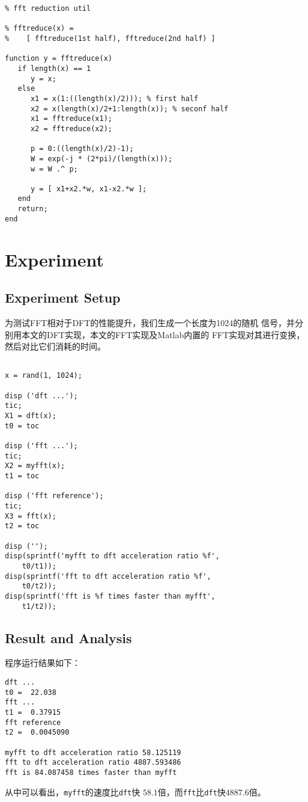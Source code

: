 \documentclass[12pt, a4paper]{article}
\begin{document}
\begin{CJK}{UTF8}{gkai}
\begin{lstlisting}[caption={fftreduce.m}]
% myfft internal helper
% fft reduction util

% fftreduce(x) = 
%    [ fftreduce(1st half), fftreduce(2nd half) ]

function y = fftreduce(x)
   if length(x) == 1
      y = x;
   else
      x1 = x(1:((length(x)/2))); % first half
      x2 = x(length(x)/2+1:length(x)); % seconf half
      x1 = fftreduce(x1);
      x2 = fftreduce(x2);

      p = 0:((length(x)/2)-1);
      W = exp(-j * (2*pi)/(length(x)));
      w = W .^ p;

      y = [ x1+x2.*w, x1-x2.*w ];
   end
   return;
end
\end{lstlisting}

\section{Experiment}

\subsection{Experiment Setup}
为测试FFT相对于DFT的性能提升，我们生成一个长度为1024的随机
信号，并分别用本文的DFT实现，本文的FFT实现及Matlab内置的
FFT实现对其进行变换，然后对比它们消耗的时间。
\begin{lstlisting}[caption={main.m}]
% fft benchmark

x = rand(1, 1024);

disp ('dft ...');
tic;
X1 = dft(x);
t0 = toc

disp ('fft ...');
tic;
X2 = myfft(x);
t1 = toc

disp ('fft reference');
tic;
X3 = fft(x);
t2 = toc

disp ('');
disp(sprintf('myfft to dft acceleration ratio %f',
    t0/t1));
disp(sprintf('fft to dft acceleration ratio %f',
    t0/t2));
disp(sprintf('fft is %f times faster than myfft',
    t1/t2));
\end{lstlisting}

\subsection{Result and Analysis}
程序运行结果如下：
\begin{lstlisting}[caption={程序运行结果}]
dft ...
t0 =  22.038
fft ...
t1 =  0.37915
fft reference
t2 =  0.0045090

myfft to dft acceleration ratio 58.125119
fft to dft acceleration ratio 4887.593486
fft is 84.087458 times faster than myfft
\end{lstlisting}
从中可以看出，\verb|myfft|的速度比\verb|dft|快
$58.1$倍，而\verb|fft|比\verb|dft|快$4887.6$倍。


\end{CJK}
\end{document}
